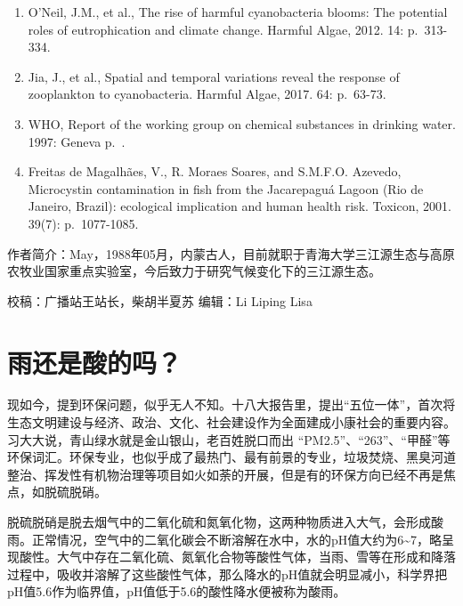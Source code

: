 \documentclass[
]{book}
\begin{document}
\begin{enumerate}
\item
  O'Neil, J.M., et al., The rise of harmful cyanobacteria blooms: The potential roles of eutrophication and climate change. Harmful Algae, 2012. 14: p.~313-334.
\item
  Jia, J., et al., Spatial and temporal variations reveal the response of zooplankton to cyanobacteria. Harmful Algae, 2017. 64: p.~63-73.
\item
  WHO, Report of the working group on chemical substances in drinking water. 1997: Geneva p.~.
\item
  Freitas de Magalhães, V., R. Moraes Soares, and S.M.F.O. Azevedo, Microcystin contamination in fish from the Jacarepaguá Lagoon (Rio de Janeiro, Brazil): ecological implication and human health risk. Toxicon, 2001. 39(7): p.~1077-1085.
\end{enumerate}

作者简介：May，1988年05月，内蒙古人，目前就职于青海大学三江源生态与高原农牧业国家重点实验室，今后致力于研究气候变化下的三江源生态。

校稿：广播站王站长，柴胡半夏苏
编辑：Li Liping Lisa

\hypertarget{ux96e8ux8fd8ux662fux9178ux7684ux5417}{%
\section{雨还是酸的吗？}\label{ux96e8ux8fd8ux662fux9178ux7684ux5417}}

现如今，提到环保问题，似乎无人不知。十八大报告里，提出``五位一体''，首次将生态文明建设与经济、政治、文化、社会建设作为全面建成小康社会的重要内容。习大大说，青山绿水就是金山银山，老百姓脱口而出 ``PM2.5''、``263''、``甲醛''等环保词汇。环保专业，也似乎成了最热门、最有前景的专业，垃圾焚烧、黑臭河道整治、挥发性有机物治理等项目如火如荼的开展，但是有的环保方向已经不再是焦点，如脱硫脱硝。

脱硫脱硝是脱去烟气中的二氧化硫和氮氧化物，这两种物质进入大气，会形成酸雨。正常情况，空气中的二氧化碳会不断溶解在水中，水的pH值大约为6\textasciitilde7，略呈现酸性。大气中存在二氧化硫、氮氧化合物等酸性气体，当雨、雪等在形成和降落过程中，吸收并溶解了这些酸性气体，那么降水的pH值就会明显减小，科学界把pH值5.6作为临界值，pH值低于5.6的酸性降水便被称为酸雨。
\end{document}
